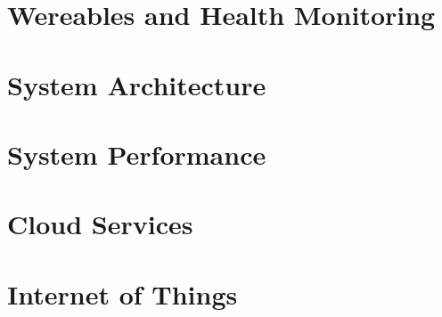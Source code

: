 \documentclass[oneside,12pt]{book}
\begin{document}
\chapter{Wereables and Health Monitoring}


\chapter{System Architecture}


\chapter{System Performance}


\chapter{Cloud Services}


\chapter{Internet of Things}



\end{document}
